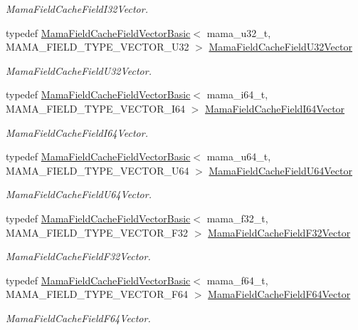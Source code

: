 \begin{DoxyCompactItemize}
\begin{DoxyCompactList}\small\item\em MamaFieldCacheFieldI32Vector. \item\end{DoxyCompactList}\item 
typedef \hyperlink{classWombat_1_1MamaFieldCacheFieldVectorBasic}{MamaFieldCacheFieldVectorBasic}$<$ mama\_\-u32\_\-t, MAMA\_\-FIELD\_\-TYPE\_\-VECTOR\_\-U32 $>$ \hyperlink{namespaceWombat_a39fdf1473fa12cd354e77e7e8b3384c0}{MamaFieldCacheFieldU32Vector}
\begin{DoxyCompactList}\small\item\em MamaFieldCacheFieldU32Vector. \item\end{DoxyCompactList}\item 
typedef \hyperlink{classWombat_1_1MamaFieldCacheFieldVectorBasic}{MamaFieldCacheFieldVectorBasic}$<$ mama\_\-i64\_\-t, MAMA\_\-FIELD\_\-TYPE\_\-VECTOR\_\-I64 $>$ \hyperlink{namespaceWombat_ae3aad400fe294834eaf5cf5712de639f}{MamaFieldCacheFieldI64Vector}
\begin{DoxyCompactList}\small\item\em MamaFieldCacheFieldI64Vector. \item\end{DoxyCompactList}\item 
typedef \hyperlink{classWombat_1_1MamaFieldCacheFieldVectorBasic}{MamaFieldCacheFieldVectorBasic}$<$ mama\_\-u64\_\-t, MAMA\_\-FIELD\_\-TYPE\_\-VECTOR\_\-U64 $>$ \hyperlink{namespaceWombat_ab7d7e6b770748f8bbe7fc34ba3b3a179}{MamaFieldCacheFieldU64Vector}
\begin{DoxyCompactList}\small\item\em MamaFieldCacheFieldU64Vector. \item\end{DoxyCompactList}\item 
typedef \hyperlink{classWombat_1_1MamaFieldCacheFieldVectorBasic}{MamaFieldCacheFieldVectorBasic}$<$ mama\_\-f32\_\-t, MAMA\_\-FIELD\_\-TYPE\_\-VECTOR\_\-F32 $>$ \hyperlink{namespaceWombat_a46f328c8d635dcebb34437c5c7d1c678}{MamaFieldCacheFieldF32Vector}
\begin{DoxyCompactList}\small\item\em MamaFieldCacheFieldF32Vector. \item\end{DoxyCompactList}\item 
typedef \hyperlink{classWombat_1_1MamaFieldCacheFieldVectorBasic}{MamaFieldCacheFieldVectorBasic}$<$ mama\_\-f64\_\-t, MAMA\_\-FIELD\_\-TYPE\_\-VECTOR\_\-F64 $>$ \hyperlink{namespaceWombat_a9642bdcd737b2de5dfcf6c1b2cd3253e}{MamaFieldCacheFieldF64Vector}
\begin{DoxyCompactList}\small\item\em MamaFieldCacheFieldF64Vector. \item\end{DoxyCompactList}\end{DoxyCompactItemize}
